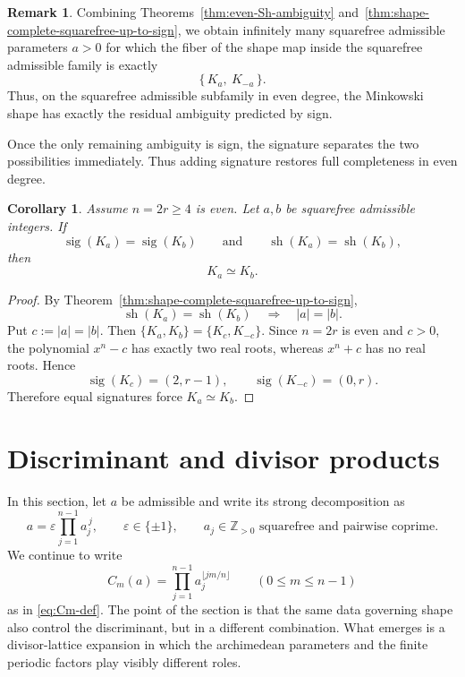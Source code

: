 \documentclass[11pt,letterpaper]{amsart}
\newcommand{\Z}{\mathbb{Z}}
\theoremstyle{plain}
\newtheorem{corollary}[theorem]{Corollary}
\theoremstyle{definition}
\newtheorem{remark}[theorem]{Remark}
\begin{document}
\begin{remark}
Combining Theorems~\ref{thm:even-Sh-ambiguity}
and~\ref{thm:shape-complete-squarefree-up-to-sign}, we obtain infinitely many squarefree admissible
parameters \(a>0\) for which the fiber of the shape map inside the squarefree admissible family is exactly
\[
\{\,K_a,\ K_{-a}\,\}.
\]
Thus, on the squarefree admissible subfamily in even degree, the Minkowski shape has exactly the residual
ambiguity predicted by sign.
\end{remark}

Once the only remaining ambiguity is sign, the signature separates the two possibilities immediately. Thus adding signature restores full completeness in even degree.

\begin{corollary}
\label{cor:sig-sh-complete-squarefree}
Assume \(n=2r\ge 4\) is even. Let \(a,b\) be squarefree admissible integers.
If
\[
\operatorname{sig}(K_a)=\operatorname{sig}(K_b)
\qquad\text{and}\qquad
\operatorname{sh}(K_a)=\operatorname{sh}(K_b),
\]
then
\[
K_a\simeq K_b.
\]
\end{corollary}

\begin{proof}
By Theorem~\ref{thm:shape-complete-squarefree-up-to-sign},
\[
\operatorname{sh}(K_a)=\operatorname{sh}(K_b)
\quad\Longrightarrow\quad
|a|=|b|.
\]
Put \(c:=|a|=|b|\). Then \(\{K_a,K_b\}=\{K_c,K_{-c}\}\).
Since \(n=2r\) is even and \(c>0\), the polynomial \(x^n-c\) has exactly two
real roots, whereas \(x^n+c\) has no real roots. Hence
\[
\operatorname{sig}(K_c)=(2,r-1),
\qquad
\operatorname{sig}(K_{-c})=(0,r).
\]
Therefore equal signatures force \(K_a\simeq K_b\).
\end{proof}




\section{Discriminant and divisor products}\label{sec:disc-divisor}

In this section, let $a$ be admissible and write its strong decomposition as
\begin{equation}\label{eq:strong-decomp-disc}
a=\varepsilon\prod_{j=1}^{n-1} a_j^{\,j},
\qquad
\varepsilon\in\{\pm1\},
\qquad
a_j\in \Z_{>0}\text{ squarefree and pairwise coprime}.
\end{equation}
We continue to write
\[
C_m(a)=\prod_{j=1}^{n-1} a_j^{\lfloor jm/n\rfloor}
\qquad (0\le m\le n-1)
\]
as in \eqref{eq:Cm-def}. The point of the section is that the same data governing shape also control the discriminant, but in a different combination. What emerges is a divisor-lattice expansion in which the archimedean parameters and the finite periodic factors play visibly different roles.
\end{document}
